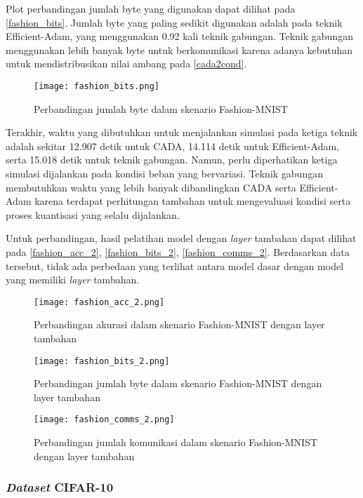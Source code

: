 Plot perbandingan jumlah byte yang digunakan dapat dilihat pada \autoref{fashion_bits}. Jumlah byte yang paling sedikit digunakan adalah pada teknik Efficient-Adam, yang menggunakan 0.92 kali teknik gabungan. Teknik gabungan menggunakan lebih banyak byte untuk berkomunikasi karena adanya kebutuhan untuk mendistribusikan nilai ambang pada \autoref{cada2cond}.

\begin{figure}[H]
  \centering
  \texttt{[image: fashion\_bits.png]}
  \caption{Perbandingan jumlah byte dalam skenario Fashion-MNIST}\label{fashion_bits}
\end{figure}

Terakhir, waktu yang dibutuhkan untuk menjalankan simulasi pada ketiga teknik adalah sekitar 12.907 detik untuk CADA, 14.114 detik untuk Efficient-Adam, serta 15.018 detik untuk teknik gabungan. Namun, perlu diperhatikan ketiga simulasi dijalankan pada kondisi beban yang bervariasi. Teknik gabungan membutuhkan waktu yang lebih banyak dibandingkan CADA serta Efficient-Adam karena terdapat perhitungan tambahan untuk mengevaluasi kondisi serta proses kuantisasi yang selalu dijalankan.

Untuk perbandingan, hasil pelatihan model dengan \emph{layer} tambahan dapat dilihat pada \autoref{fashion_acc_2}, \autoref{fashion_bits_2}, \autoref{fashion_comms_2}. Berdasarkan data tersebut, tidak ada perbedaan yang terlihat antara model dasar dengan model yang memiliki \emph{layer} tambahan.

\begin{figure}[H]
  \centering
  \texttt{[image: fashion\_acc\_2.png]}
  \caption{Perbandingan akurasi dalam skenario Fashion-MNIST dengan layer tambahan}\label{fashion_acc_2}
\end{figure}

\begin{figure}[H]
  \centering
  \texttt{[image: fashion\_bits\_2.png]}
  \caption{Perbandingan jumlah byte dalam skenario Fashion-MNIST dengan layer tambahan}\label{fashion_bits_2}
\end{figure}

\begin{figure}[H]
  \centering
  \texttt{[image: fashion\_comms\_2.png]}
  \caption{Perbandingan jumlah komunikasi dalam skenario Fashion-MNIST dengan layer tambahan}\label{fashion_comms_2}
\end{figure}


\subsubsection{\emph{Dataset} CIFAR-10}

